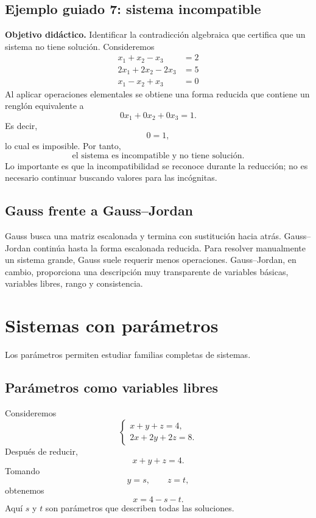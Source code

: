 \documentclass[12pt]{article}
\theoremstyle{remark}
\begin{document}
\subsection*{Ejemplo guiado 7: sistema incompatible}

\textbf{Objetivo didáctico.} Identificar la contradicción algebraica que certifica que un sistema no tiene solución.
Consideremos
\[
\begin{aligned}
x_{1} + x_{2} - x_{3} &= 2\\
2 x_{1} + 2 x_{2} - 2 x_{3} &= 5\\
x_{1} - x_{2} + x_{3} &= 0
\end{aligned}
\]
Al aplicar operaciones elementales se obtiene una forma reducida que contiene un renglón equivalente a
\[
0x_1+0x_2+0x_3=1.
\]
Es decir,
\[
0=1,
\]
lo cual es imposible. Por tanto,
\[
\boxed{\text{el sistema es incompatible y no tiene solución}.}
\]
Lo importante es que la incompatibilidad se reconoce durante la reducción; no es necesario continuar buscando valores para las incógnitas.

\subsection{Gauss frente a Gauss--Jordan}

Gauss busca una matriz escalonada y termina con sustitución hacia atrás. Gauss--Jordan continúa hasta
la forma escalonada reducida. Para resolver manualmente un sistema grande, Gauss suele requerir menos
operaciones. Gauss--Jordan, en cambio, proporciona una descripción muy transparente de variables
básicas, variables libres, rango y consistencia.


\section{Sistemas con parámetros}

Los parámetros permiten estudiar familias completas de sistemas.

\subsection{Parámetros como variables libres}

Consideremos
\[
\begin{cases}
x+y+z=4,\\
2x+2y+2z=8.
\end{cases}
\]
Después de reducir,
\[
x+y+z=4.
\]
Tomando
\[
y=s,\qquad z=t,
\]
obtenemos
\[
x=4-s-t.
\]
Aquí $s$ y $t$ son parámetros que describen todas las soluciones.
\end{document}
